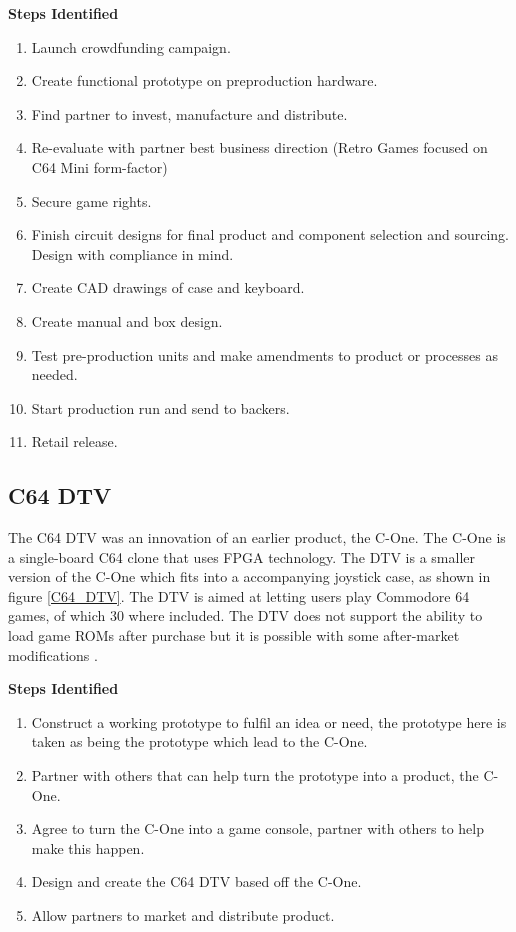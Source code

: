 \textbf{Steps Identified}\\
\begin{enumerate}
\item Launch crowdfunding campaign.
\item Create functional prototype on preproduction hardware.
\item Find partner to invest, manufacture and distribute.
\item Re-evaluate with partner best business direction (Retro Games focused on C64 Mini form-factor)
\item Secure game rights.
\item Finish circuit designs for final product and component selection and sourcing. Design with compliance in mind.
\item Create CAD drawings of case and keyboard.
\item Create manual and box design.
\item Test pre-production units and make amendments to product or processes as needed.
\item Start production run and send to backers.
\item Retail release.
\end{enumerate} 


\subsection{C64 DTV}
The C64 DTV was an innovation of an earlier product, the C-One. The C-One is a single-board C64 clone that uses FPGA technology. The DTV is a smaller version of the C-One which fits into a accompanying joystick case, as shown in figure \ref{C64_DTV}. The DTV is aimed at letting users play Commodore 64 games, of which 30 where included. The DTV does not support the ability to load game ROMs after purchase but it is possible with some after-market modifications 
\cite{RN161}.

\textbf{Steps Identified}\\
\begin{enumerate}
\item Construct a working prototype to fulfil an idea or need, the prototype here is taken as being the prototype which lead to the C-One. 
\item Partner with others that can help turn the prototype into a product, the C-One.
\item Agree to turn the C-One into a game console, partner with others to help make this happen.
\item Design and create the C64 DTV based off the C-One.
\item Allow partners to market and distribute product.
\end{enumerate} 


